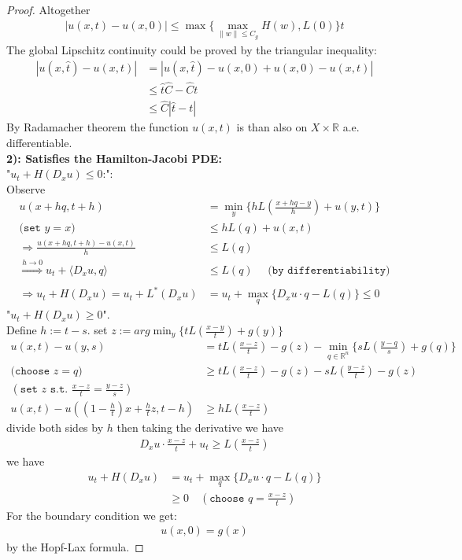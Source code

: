 \documentclass[a4paper,11pt,oneside,fleqn]{book}
\theoremstyle{definition}
\theoremstyle{remark}
\begin{document}
\begin{proof}
	Altogether
	\begin{align*}
		|u(x, t) - u(x, 0)| \le \max \bigg\{\max_{\|w\| \le C_g} H(w), L(0)\bigg\}t 
	\end{align*}
	The global Lipschitz continuity could be proved by the triangular inequality:
	\begin{align*}
		|u(x, \hat{t}) - u(x, t)| &=| u(x, \hat{t}) - u(x, 0) + u(x, 0) - u(x, t) |\\
		&\le \hat{t} \hat{C} - \hat{C} t\\
		&\le \hat{C}|\hat{t} - t|  
	\end{align*}
	By Radamacher theorem the function $u(x, t)$ is than also on $X \times \mathbb{R}$ a.e. differentiable. \\
	\textbf{2): Satisfies the Hamilton-Jacobi PDE:} \\
	"$u_t + H(D_x u) \le 0$:": \\
	Observe
	\begin{align*}
		u(x + hq, t + h)&= \min_y \biggl\{ h L(\frac{x + hq - y}{h}) + u(y, t)\biggr\} \\
		\texttt{(set $y = x$)} \quad 
		&\le h L(q) + u(x, t) \\
		\Rightarrow 
		\frac{u(x+ hq, t + h) - u(x, t)}{h} &\le L(q)\\
		\overset{h \rightarrow 0}{\Rightarrow} u_t + \langle D_x u, q \rangle &\le L(q) \quad \texttt{ (by differentiability})\\ 
		\\\Rightarrow
		u_t + H(D_x u) = u_t + L^*(D_x u) &=  u_t + \max_q \{ D_x u \cdot q - L(q)\}\le 0
	\end{align*}
	"$u_t + H(D_x u) \ge 0$".\\
	Define $h := t - s$. set $z := arg \min_y \{ t L (\frac{x - y}{t}) + g(y) \}$
	\begin{align*}
		u(x, t) - u(y, s) &=  tL(\frac{x - z}{t}) - g(z) - \min_{q \in \mathbb{R}^n} \{ s L(\frac{y - q}{s}) + g(q) \} \\
		\texttt{(choose $z = q$)}
		&\ge tL(\frac{x - z}{t}) - g(z) - sL(\frac{y - z}{t}) - g(z)\\
	(\texttt{set $z$ s.t. $\frac{x - z}{t} = \frac{y - z}{s}$})\\
		u(x, t) - u((1-\frac{h}{t}) x + \frac{h}{t}z  , t - h) &\geq h  L(\frac{x - z}{t})
	\end{align*}
	divide both sides by $h$ then taking the derivative we have
	\begin{align*}
		D_x u \cdot \frac{x - z}{t} + u_t \geq L(\frac{ x - z}{t})
	\end{align*}
	we have
	\begin{align*}
		u_t + H(D_x u) &= u_t + \max_q\{ D_x u \cdot q - L(q)\}\\
		&\ge 0 \quad (\texttt{choose }q = \frac{x - z }{t})
	\end{align*}
	For the boundary condition we get:
	\begin{align*}
		u(x, 0) = g(x)
	\end{align*}
	by the Hopf-Lax formula.
\end{proof}
\end{document}
